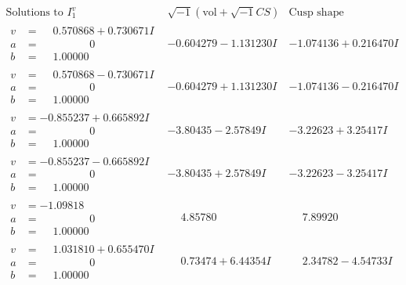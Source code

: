\documentclass[1p]{elsarticle_modified}
\theoremstyle{definition}
\newcommand{\I}{\sqrt{-1}}
\begin{document}
$$\begin{array}{c|c|c}  
\text{Solutions to }I^v_{1}& \I (\text{vol} + \sqrt{-1}CS) & \text{Cusp shape}\\
 \hline 
\begin{aligned}
v &= \phantom{-}0.570868 + 0.730671 I \\
a &= \phantom{-0.000000 } 0 \\
b &= \phantom{-}1.00000\phantom{ +0.000000I}\end{aligned}
 & -0.604279 - 1.131230 I & -1.074136 + 0.216470 I \\ \hline\begin{aligned}
v &= \phantom{-}0.570868 - 0.730671 I \\
a &= \phantom{-0.000000 } 0 \\
b &= \phantom{-}1.00000\phantom{ +0.000000I}\end{aligned}
 & -0.604279 + 1.131230 I & -1.074136 - 0.216470 I \\ \hline\begin{aligned}
v &= -0.855237 + 0.665892 I \\
a &= \phantom{-0.000000 } 0 \\
b &= \phantom{-}1.00000\phantom{ +0.000000I}\end{aligned}
 & -3.80435 - 2.57849 I & -3.22623 + 3.25417 I \\ \hline\begin{aligned}
v &= -0.855237 - 0.665892 I \\
a &= \phantom{-0.000000 } 0 \\
b &= \phantom{-}1.00000\phantom{ +0.000000I}\end{aligned}
 & -3.80435 + 2.57849 I & -3.22623 - 3.25417 I \\ \hline\begin{aligned}
v &= -1.09818\phantom{ +0.000000I} \\
a &= \phantom{-0.000000 } 0 \\
b &= \phantom{-}1.00000\phantom{ +0.000000I}\end{aligned}
 & \phantom{-}4.85780\phantom{ +0.000000I} & \phantom{-}7.89920\phantom{ +0.000000I} \\ \hline\begin{aligned}
v &= \phantom{-}1.031810 + 0.655470 I \\
a &= \phantom{-0.000000 } 0 \\
b &= \phantom{-}1.00000\phantom{ +0.000000I}\end{aligned}
 & \phantom{-}0.73474 + 6.44354 I & \phantom{-}2.34782 - 4.54733 I \\ \hline\begin{aligned}

\end{aligned}
\end{array}$$
\end{document}

